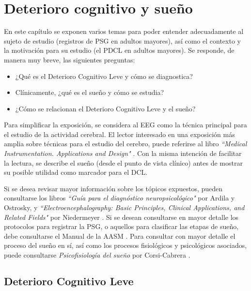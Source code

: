 \documentclass[12pt,letterpaper]{book}
\begin{document}
\chapter{Deterioro cognitivo y sueño}

En este capítulo se exponen varios temas para poder entender adecuadamente al sujeto de estudio (registros de PSG en adultos mayores), así como el contexto y la motivación para su estudio (el PDCL en adultos mayores).
%
Se responde, de manera muy breve, las siguientes preguntas:
\begin{itemize}
\item ¿Qué es el Deterioro Cognitivo Leve y cómo se diagnostica?
\item Clínicamente, ¿qué es el sueño y cómo se estudia?
\item ¿Cómo se relacionan el Deterioro Cognitivo Leve y el sueño?
\end{itemize}

Para simplificar la exposición, se considera al EEG como la técnica principal para el estudio de la actividad cerebral.
%
El lector interesado en una exposición más amplia sobre técnicas para el estudio del cerebro, puede referirse al libro \textit{``Medical Instrumentation. Applications and Design"} \cite{Webster}.
%
Con la misma intención de facilitar la lectura, se describe el sueño (desde el punto de vista clínico) antes de mostrar su posible utilidad como marcador para el DCL.

Si se desea revisar mayor información sobre los tópicos expuestos, pueden consultarse los libros \textit{``Guía para el diagnóstico neuropsicológico"} \cite{Ardila12} por Ardila y Ostrosky, y \textit{``Electroencephalography: Basic Principles, Clinical Applications, and Related Fields"} por Niedermeyer \cite{niedermeyer}.
%
Si se desean consultarse en mayor detalle los protocolos para registrar la PSG, o aquellos para clasificar las etapas de sueño, debe consultarse el Manual de la AASM \cite{AASM07}.
%
Para consultar con mayor detalle el proceso del sueño en sí, así como los procesos fisiológicos y psicológicos asociados, puede consultarse \textit{Psicofisiología del sueño} por Corsi-Cabrera \cite{Corsi1983}.


\section{Deterioro Cognitivo Leve}
\label{seccion:dcl}
\end{document}
